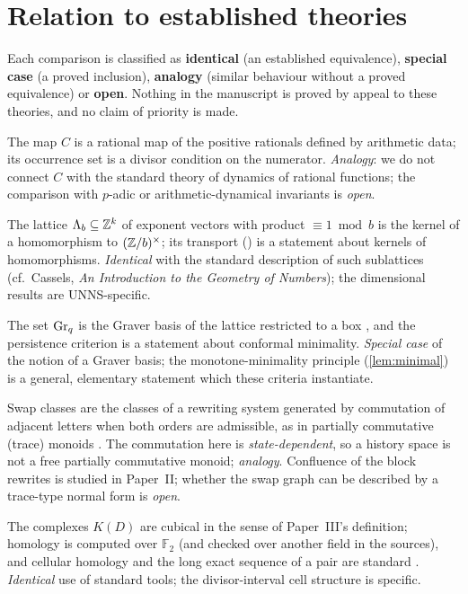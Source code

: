 \section{Relation to established theories}\label{sec:theories}
Each comparison is classified as \textbf{identical} (an established equivalence), \textbf{special case} (a proved inclusion), \textbf{analogy} (similar behaviour without a proved equivalence) or \textbf{open}. Nothing in the manuscript is proved by appeal to these theories, and no claim of priority is made.
\begin{description}[leftmargin=1.2em,itemsep=3pt]
\item[Arithmetic dynamics and divisibility systems.] The map $C$ is a rational map of the positive rationals defined by arithmetic data; its occurrence set is a divisor condition on the numerator. \emph{Analogy}: we do not connect $C$ with the standard theory of dynamics of rational functions; the comparison with $p$-adic or arithmetic-dynamical invariants is \emph{open}.
\item[Geometry of numbers and lattice relations.] The lattice $\Lambda_b\subseteq\mathbb Z^k$ of exponent vectors with product $\equiv1\bmod b$ is the kernel of a homomorphism to $(\mathbb Z/b)^\times$; its transport () is a statement about kernels of homomorphisms. \emph{Identical} with the standard description of such sublattices (cf.\ Cassels, \emph{An Introduction to the Geometry of Numbers}); the dimensional results are UNNS-specific.
\item[Graver bases.] The set $\mathrm{Gr}_q$ is the Graver basis of the lattice restricted to a box \cite{Graver1975,Sturmfels1996}, and the persistence criterion  is a statement about conformal minimality. \emph{Special case} of the notion of a Graver basis; the monotone-minimality principle (\cref{lem:minimal}) is a general, elementary statement which these criteria instantiate.
\item[Rewriting systems and confluence; trace monoids.] Swap classes are the classes of a rewriting system generated by commutation of adjacent letters when both orders are admissible, as in partially commutative (trace) monoids \cite{DiekertRozenberg1995}. The commutation here is \emph{state-dependent}, so a history space is not a free partially commutative monoid; \emph{analogy}. Confluence of the block rewrites is studied in Paper~II; whether the swap graph can be described by a trace-type normal form is \emph{open}.
\item[Cubical and cellular complexes; homology.] The complexes $K(D)$ are cubical in the sense of Paper~III's definition; homology is computed over $\mathbb F_2$ (and checked over another field in the sources), and cellular homology and the long exact sequence of a pair are standard \cite{Hatcher2002}. \emph{Identical} use of standard tools; the divisor-interval cell structure is specific.

\end{description}
